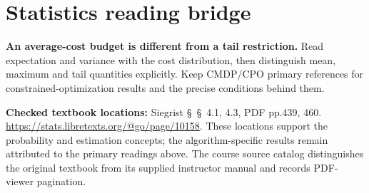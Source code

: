 \documentclass[11pt]{scrartcl}
\begin{document}
\section*{Statistics reading bridge}
\textbf{An average-cost budget is different from a tail restriction.} Read expectation and variance with the cost distribution, then distinguish mean, maximum and tail quantities explicitly. Keep CMDP/CPO primary references for constrained-optimization results and the precise conditions behind them.

\textbf{Checked textbook locations:} Siegrist \S~\S~4.1, 4.3, PDF pp.439, 460. \url{https://stats.libretexts.org/@go/page/10158}. These locations support the probability and estimation concepts; the algorithm-specific results remain attributed to the primary readings above. The course source catalog distinguishes the original textbook from its supplied instructor manual and records PDF-viewer pagination.
\end{document}
